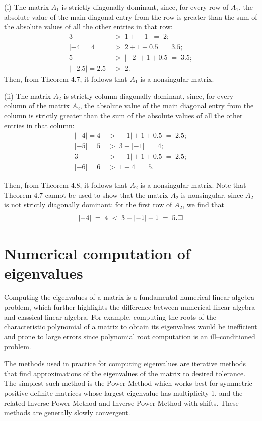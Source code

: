 \begin{answerx}
(i) The matrix $A_1$ is strictly diagonally dominant, since, for every row of $A_1$,
the absolute value of the main diagonal entry from the row is greater than the sum of
the absolute values of all the other entries in that row:
\begin{align*}
3 \;&>\; 1 + |{-1}| \;=\; 2;\\
|{-4}| = 4 \;&>\; 2 + 1 + 0.5 \;=\; 3.5;\\
5 \;&>\; |{-2}| + 1 + 0.5 \;=\; 3.5;\\
|{-2.5}| = 2.5 \;&>\; 2.
\end{align*}
Then, from Theorem 4.7, it follows that $A_1$ is a nonsingular matrix.

(ii) The matrix $A_2$ is strictly column diagonally dominant, since, for every column
of the matrix $A_2$, the absolute value of the main diagonal entry from the column is
strictly greater than the sum of the absolute values of all the other entries in that
column:
\begin{align*}
|{-4}| = 4 \;&>\; |{-1}| + 1 + 0.5 \;=\; 2.5;\\
|{-5}| = 5 \;&>\; 3 + |{-1}| \;=\; 4;\\
3 \;&>\; |{-1}| + 1 + 0.5 \;=\; 2.5;\\
|{-6}| = 6 \;&>\; 1 + 4 \;=\; 5.
\end{align*}

Then, from Theorem 4.8, it follows that $A_2$ is a nonsingular matrix.
Note that Theorem 4.7 cannot be used to show that the matrix $A_2$ is nonsingular,
since $A_2$ is not strictly diagonally dominant: for the first row of $A_2$, we find
that
\[
|{-4}| \;=\; 4 \;<\; 3 + |{-1}| + 1 \;=\; 5. \hfill\square
\]
\end{answerx}

\section{Numerical computation of eigenvalues}

Computing the eigenvalues of a matrix is a fundamental numerical linear algebra
problem, which further highlights the difference between numerical linear algebra and
classical linear algebra. For example, computing the roots of the characteristic
polynomial of a matrix to obtain its eigenvalues would be inefficient and prone to
large errors since polynomial root computation is an ill--conditioned problem.

The methods used in practice for computing eigenvalues are iterative methods that find
approximations of the eigenvalues of the matrix to desired tolerance. The simplest such
method is the Power Method which works best for symmetric positive definite matrices
whose largest eigenvalue has multiplicity 1, and the related Inverse Power Method and
Inverse Power Method with shifts. These methods are generally slowly convergent.

